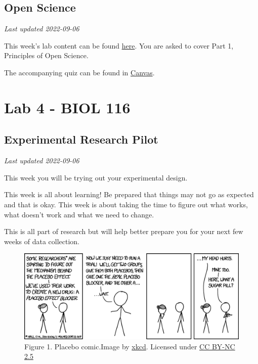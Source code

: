 \documentclass[
]{book}
\begin{document}
\hypertarget{open-science-1}{%
\chapter*{Open Science}\label{open-science-1}}

\emph{Last updated 2022-09-06}

This week's lab content can be found \href{https://ubco-biology.github.io/OS-Introduction/}{here}. You are asked to cover Part 1, Principles of Open Science.

The accompanying quiz can be found in \href{https://canvas.ubc.ca}{Canvas}.

\hypertarget{part-lab-4---biol-116}{%
\part*{Lab 4 - BIOL 116}\label{part-lab-4---biol-116}}

\hypertarget{experimental-research-pilot}{%
\chapter*{Experimental Research Pilot}\label{experimental-research-pilot}}

\emph{Last updated 2022-09-06}

This week you will be trying out your experimental design.

This week is all about learning! Be prepared that things may not go as expected and that is okay. This week is about taking the time to figure out what works, what doesn't work and what we need to change.

This is all part of research but will help better prepare you for your next few weeks of data collection.

\begin{figure}
\centering
\includegraphics{figures_images/Lab4-Fig1.png}
\caption{Figure 1. Placebo comic.Image by \href{https://xkcd.com/1526/}{xkcd}. Licensed under \href{https://creativecommons.org/licenses/by-nc/2.5/}{CC BY-NC 2.5}}
\end{figure}
\end{document}
